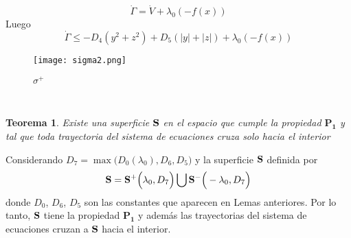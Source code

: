 \documentclass[letter]{article}
\newtheorem{theo}{Teorema}
\begin{document}
$$\dot{\Gamma}=\dot{V}+\lambda_0(-f(x))$$
Luego
\begin{equation}\label{esfera}
\dot{\Gamma}\leq -D_4(y^2+z^2)+D_5(|y|+|z|)+\lambda_0(-f(x))
\end{equation}
\begin{figure}[h]
\centering
\texttt{[image: sigma2.png]}
\caption{ $\sigma^+$} \label{sfig30}
\end{figure}
\\
\begin{theo}\label{BT1}
Existe una superficie ${\bf S}$ en el espacio que cumple la
propiedad $\mathbf{P_1}$ y tal que toda trayectoria del sistema de
ecuaciones  cruza solo hacia el interior
\end{theo}
Considerando $D_{7}=\max\Big(D_0(\lambda_0),D_6,D_5\Big)$ y  la
superficie ${\bf S}$ definida por
\begin{equation}\label{Be35}
{\bf S}={\bf S}^+\Big(\lambda_0,D_{7}\Big)\bigcup {\bf
S}^-\Big(-\lambda_0,D_7\Big)
\end{equation}
donde $D_0$, $D_6$, $D_{5}$ son las constantes que aparecen en
Lemas anteriores. Por lo tanto, ${\bf S}$ tiene la propiedad
$\mathbf{P_1}$ y adem{\'a}s  las trayectorias del sistema de
ecuaciones cruzan a ${\bf S}$ hacia el interior.
\end{document}
